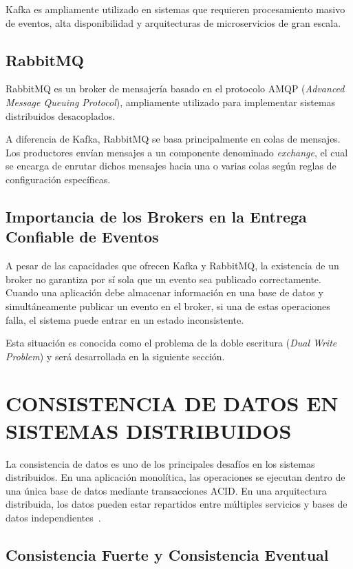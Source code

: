 Kafka es ampliamente utilizado en sistemas que requieren procesamiento masivo de eventos, alta disponibilidad y arquitecturas de microservicios de gran escala.

\subsection{RabbitMQ}

RabbitMQ es un broker de mensajería basado en el protocolo AMQP (\textit{Advanced Message Queuing Protocol}), ampliamente utilizado para implementar sistemas distribuidos desacoplados.

A diferencia de Kafka, RabbitMQ se basa principalmente en colas de mensajes. Los productores envían mensajes a un componente denominado \textit{exchange}, el cual se encarga de enrutar dichos mensajes hacia una o varias colas según reglas de configuración específicas.

\subsection{Importancia de los Brokers en la Entrega Confiable de Eventos}

A pesar de las capacidades que ofrecen Kafka y RabbitMQ, la existencia de un broker no garantiza por sí sola que un evento sea publicado correctamente. Cuando una aplicación debe almacenar información en una base de datos y simultáneamente publicar un evento en el broker, si una de estas operaciones falla, el sistema puede entrar en un estado inconsistente.

Esta situación es conocida como el problema de la doble escritura (\textit{Dual Write Problem}) y será desarrollada en la siguiente sección.

\section{CONSISTENCIA DE DATOS EN SISTEMAS DISTRIBUIDOS}

La consistencia de datos es uno de los principales desafíos en los sistemas distribuidos. En una aplicación monolítica, las operaciones se ejecutan dentro de una única base de datos mediante transacciones ACID. En una arquitectura distribuida, los datos pueden estar repartidos entre múltiples servicios y bases de datos independientes~\parencite{kleppmann2017}.

\subsection{Consistencia Fuerte y Consistencia Eventual}

